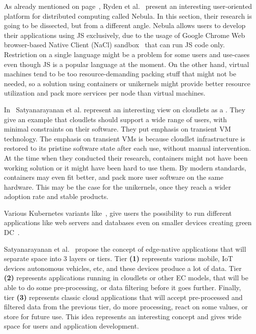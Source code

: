 As already mentioned on page~\pageref{sec:rayden}, Ryden et al.~\cite{RydenOCW14} present an interesting user-oriented platform for distributed computing called Nebula. In this section, their research is going to be dissected, but from a different angle. Nebula allows users to develop their applications using JS exclusively, due to the usage of Google Chrome Web browser-based Native Client (NaCl) sandbox~\cite{YeeSDCMOONF10} that can run JS code only. Restriction on a single language might be a problem for some users and use-cases even though JS is a popular language at the moment. On the other hand, virtual machines tend to be too resource-demanding packing stuff that might not be needed, so a solution using containers or unikernels might provide better resource utilization and pack more services per node than virtual machines.

In~\cite{SatyanarayananBCD09} Satyanarayanan et al. represent an interesting view on cloudlets as a . They give an example that cloudlets should support a wide range of users, with minimal constraints on their software. They put emphasis on transient VM technology. The emphasis on transient VMs is because cloudlet infrastructure is restored to its pristine software state after each use, without manual intervention. At the time when they conducted their research, containers might not have been working solution or it might have been hard to use them. By modern standards, containers may even fit better, and pack more user software on the same hardware. This may be the case for the unikernels, once they reach a wider adoption rate and stable products.

Various Kubernetes variants like~\cite{KubeEdge, RossiCPN20}, give users the possibility to run different applications like web servers and databases even on smaller devices creating green DC~\cite{ArocaG12}.

Satyanarayanan et al.~\cite{SatyanarayananK19} propose the concept of edge-native applications that will separate space into 3 layers or tiers. Tier \textbf{(1)} represents various mobile, IoT devices autonomous vehicles, etc, and these devices produce a lot of data. Tier \textbf{(2)} represents applications running in cloudlets or other EC models, that will be able to do some pre-processing, or data filtering before it goes further. Finally, tier \textbf{(3)} represents classic cloud applications that will accept pre-processed and filtered data from the previous tier, do more processing, react on some values, or store for future use. This idea represents an interesting concept and gives wide space for users and application development.

